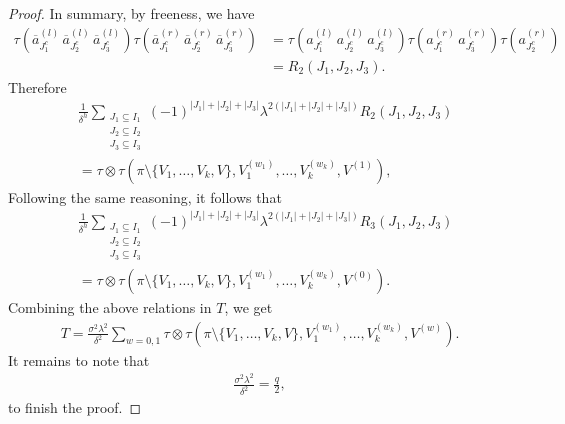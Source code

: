 \documentclass[10pt,a4paper]{amsart}
\begin{document}
\begin{proof}
    In summary, by freeness, we have
    \begin{align*}
        \tau\left(\overline{a}_{J_1^c}^{(l)}\, \overline{a}_{J_2^c}^{(l)}\, \overline{a}_{J_3^c}^{(l)}\right)\tau\left(\overline{a}_{J_1^c}^{(r)}\, \overline{a}_{J_2^c}^{(r)}\, \overline{a}_{J_3^c}^{(r)}\right)&=\tau\left(a_{J_1^c}^{(l)}\, a_{J_2^c}^{(l)}\, a_{J_3^c}^{(l)}\right)\tau\left(a_{J_1^c}^{(r)}\, a_{J_3^c}^{(r)}\right)\tau\left(a_{J_2^c}^{(r)}\right)\\
        &=R_2(J_1,J_2,J_3).
    \end{align*}
    Therefore
    \begin{align*}
        &\frac{1}{\delta^h}\sum_{\substack{J_1 \subseteq I_1\\ J_2 \subseteq I_2\\ J_3 \subseteq I_3}}(-1)^{|J_1|+|J_2|+|J_3|}\lambda^{2(|J_1|+|J_2|+|J_3|)}R_2(J_1,J_2,J_3)\\
        &=\tau\otimes \tau\left(\pi\setminus\{V_1,\ldots,V_k,V\},V_1^{(w_1)},\ldots,V_k^{(w_k)},V^{(1)}\right),
    \end{align*}
    Following the same reasoning, it follows that
    \begin{align*}
        &\frac{1}{\delta^h}\sum_{\substack{J_1 \subseteq I_1\\ J_2 \subseteq I_2\\ J_3 \subseteq I_3}}(-1)^{|J_1|+|J_2|+|J_3|}\lambda^{2(|J_1|+|J_2|+|J_3|)}R_3(J_1,J_2,J_3)\\
        &=\tau\otimes \tau\left(\pi\setminus\{V_1,\ldots,V_k,V\},V_1^{(w_1)},\ldots,V_k^{(w_k)},V^{(0)}\right).
    \end{align*}
    Combining the above relations in $T$, we get
    \begin{align*}
        T=\frac{\sigma^2\lambda^2}{\delta^2}\sum_{w=0,1}\tau\otimes \tau\left(\pi\setminus\{V_1,\ldots,V_k,V\},V_1^{(w_1)},\ldots,V_k^{(w_k)},V^{(w)}\right).
    \end{align*}
    It remains to note that 
    \begin{align*}
        \frac{\sigma^2\lambda^2}{\delta^2}=\frac{q}{2},
    \end{align*}
    to finish the proof. 
\end{proof}
\end{document}
